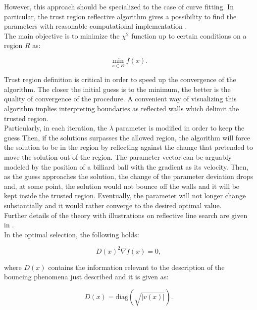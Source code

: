 \documentclass[openany]{book}
\begin{document}
However, this approach should be specialized to the case of curve fitting. In particular, the trust region reflective algorithm gives a possibility to find the parameters with reasonable computational implementation \cite{branch_coleman_li_1999}. \\

The main objective is to minimize the $\chi^2$ function up to certain conditions on a region $R$ as:

\begin{equation}\label{eq:constrained_fitting_definition}
	\min_{x \in R} f(x).
\end{equation}
 
Trust region definition is critical in order to speed up the convergence of the algorithm. The closer the initial guess is to the minimum, the better is the quality of convergence of the procedure.   A convenient way of visualizing this algorithm implies interpreting boundaries as reflected walls which delimit the trusted region. \\ 

Particularly, in each iteration, the $\lambda$ parameter is modified in order to keep the guess
Then, if the solutions surpasses the allowed region, the algorithm will force the solution to be in the region by reflecting against the change that pretended to move the solution out of the region. The parameter vector can be arguably modeled by the position of a billiard ball with the gradient as its velocity.  Then, as the guess approaches the solution, the change of the parameter deviation drops and, at some point, the solution would not bounce off the walls and it will be kept inside the trusted region. Eventually, the parameter will not longer change substantially and it would rather converge to the desired optimal value. \\

Further details of the  theory with illustrations on reflective line search are given in \cite{coleman_li_1994}.  \\ 

In the optimal selection,  the following holds:

\begin{equation}\label{eq:constrained_fitting_optimal}
	D(x)^2 \nabla f(x) = 0,
\end{equation}

where $D(x)$ contains the information relevant to the description of the bouncing phenomena just described and it is given as:

\begin{equation}\label{eq:constrained_fitting_optimal_D}
	D(x) = \mathrm{diag} (\sqrt{|v(x)|}).
\end{equation}
\end{document}
